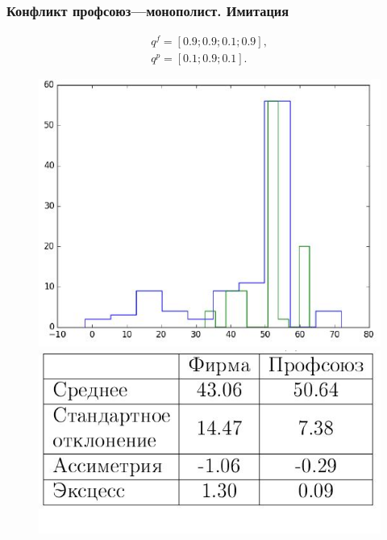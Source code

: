 \documentclass {beamer}
\begin{document}
\begin{frame}
\frametitle{Конфликт профсоюз---монополист. Имитация}
 \begin{gather*}
 q^f = \left[ 0.9; 0.9; 0.1; 0.9 \right], \\
 q^p = \left[ 0.1; 0.9; 0.1 \right].
 \end{gather*}
	\begin{figure}
		\begin{minipage}[b]{0.45\textwidth}
			
			\includegraphics[width=\textwidth]{firm3}
		\end{minipage}
		\begin{minipage}[b]{0.45\textwidth}
			
			\includegraphics[width=\textwidth]{firmtable3}
		\end{minipage}
		
	\end{figure}
\end{frame}
\end{document}
